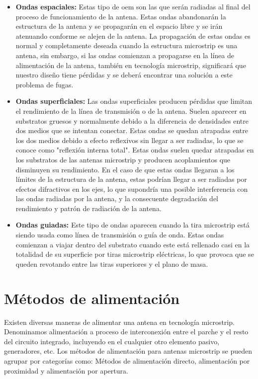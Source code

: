 \begin{itemize}
\item \textbf{Ondas espaciales: }Estas tipo de \gls{oem} son las que serán radiadas al final del proceso de funcionamiento de la antena. Estas ondas abandonarán la estructura de la antena y se propagarán en el espacio libre y se irán atenuando conforme se alejen de la antena. La propagación de estas ondas es normal y completamente deseada cuando la estructura microstrip es una antena, sin embargo, si las ondas comienzan a propagarse en la línea de alimentación de la antena, también en tecnología microstrip, significará que nuestro diseño tiene pérdidas y se deberá encontrar una solución a este problema de fugas.

\item \textbf{Ondas superficiales: }Las ondas superficiales producen pérdidas que limitan el rendimiento de la línea de transmisión o de la antena. Suelen aparecer en substratos gruesos y normalmente debido a la diferencia de densidades entre dos medios que se intentan conectar. Estas ondas se quedan atrapadas entre los dos medios debido a efecto reflexivos sin llegar a ser radiadas, lo que se conoce como "reflexión interna total". Estas ondas suelen quedar atrapadas en los substratos de las antenas microstrip y producen acoplamientos que disminuyen su rendimiento. En el caso de que estas ondas llegaran a los límites de la estructura de la antena, estas podrían llegar a ser radiadas por efectos difractivos en los ejes, lo que supondría una posible interferencia con las ondas radiadas por la antena, y la consecuente degradación del rendimiento y patrón de radiación de la antena.

\item \textbf{Ondas guiadas: }Este tipo de ondas aparecen cuando la tira microstrip está siendo usada como línea de transmisión o guía de onda. Estas ondas comienzan a viajar dentro del substrato cuando este está rellenado casi en la totalidad de su superficie por tiras microstrip eléctricas, lo que provoca que se queden revotando entre las tiras superiores y el plano de masa.
\end{itemize}

\section{Métodos de alimentación}

\par Existen diversas maneras de alimentar una antena en tecnología microstrip. Denominamos alimentación a proceso de interconexión entre el parche y el resto del circuito integrado, incluyendo en el cualquier otro elemento pasivo, generadores, etc. Los métodos de alimentación para antenas microstrip se pueden agrupar por categorías como: Métodos de alimentación directo, alimentación por proximidad y alimentación por apertura. 

